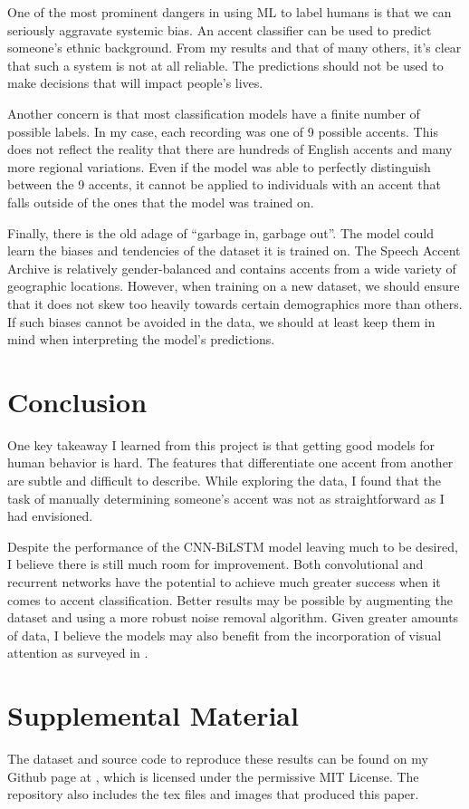\documentclass[11pt,a4paper]{article}
\begin{document}
One of the most prominent dangers in using ML to label humans is that we can seriously aggravate systemic bias. An accent classifier can be used to predict someone's ethnic background. From my results and that of many others, it’s clear that such a system is not at all reliable. The predictions should not be used to make decisions that will impact people's lives.

Another concern is that most classification models have a finite number of possible labels. In my case, each recording was one of 9 possible accents. This does not reflect the reality that there are hundreds of English accents and many more regional variations. Even if the model was able to perfectly distinguish between the 9 accents, it cannot be applied to individuals with an accent that falls outside of the ones that the model was trained on.

Finally, there is the old adage of ``garbage in, garbage out''. The model could learn the biases and tendencies of the dataset it is trained on. The Speech Accent Archive is relatively gender-balanced and contains accents from a wide variety of geographic locations. However, when training on a new dataset, we should ensure that it does not skew too heavily towards certain demographics more than others. If such biases cannot be avoided in the data, we should at least keep them in mind when interpreting the model's predictions.

\section{Conclusion} \label{sec:conclusion}

One key takeaway I learned from this project is that getting good models for human behavior is hard. The features that differentiate one accent from another are subtle and difficult to describe. While exploring the data, I found that the task of manually determining someone's accent was not as straightforward as I had envisioned.

Despite the performance of the CNN-BiLSTM model leaving much to be desired, I believe there is still much room for improvement. Both convolutional and recurrent networks have the potential to achieve much greater success when it comes to accent classification. Better results may be possible by augmenting the dataset and using a more robust noise removal algorithm. Given greater amounts of data, I believe the models may also benefit from the incorporation of visual attention as surveyed in \citet{attention}.




\appendix

\section{Supplemental Material}
\label{sec:supplemental}

The dataset and source code to reproduce these results can be found on my Github page at \citet{github}, which is licensed under the permissive MIT License. The repository also includes the tex files and images that produced this paper.
\end{document}
